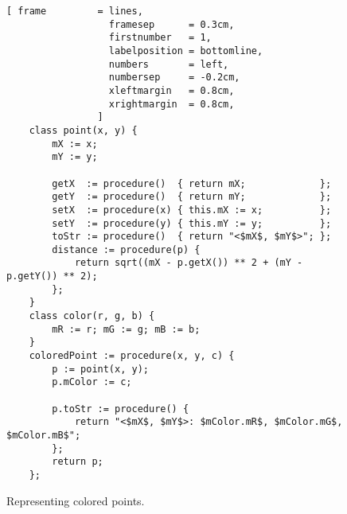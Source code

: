 \begin{figure}[!ht]
\centering
\begin{Verbatim}[ frame         = lines, 
                  framesep      = 0.3cm, 
                  firstnumber   = 1,
                  labelposition = bottomline,
                  numbers       = left,
                  numbersep     = -0.2cm,
                  xleftmargin   = 0.8cm,
                  xrightmargin  = 0.8cm,
                ]
    class point(x, y) {
        mX := x;
        mY := y;
    
        getX  := procedure()  { return mX;             };
        getY  := procedure()  { return mY;             };
        setX  := procedure(x) { this.mX := x;          };
        setY  := procedure(y) { this.mY := y;          };
        toStr := procedure()  { return "<$mX$, $mY$>"; };
        distance := procedure(p) {
            return sqrt((mX - p.getX()) ** 2 + (mY - p.getY()) ** 2);
        };
    }
    class color(r, g, b) {
        mR := r; mG := g; mB := b;
    }    
    coloredPoint := procedure(x, y, c) {
        p := point(x, y);
        p.mColor := c;
        
        p.toStr := procedure() {
            return "<$mX$, $mY$>: $mColor.mR$, $mColor.mG$, $mColor.mB$";
        };
        return p;
    };
\end{Verbatim}
\vspace*{-0.3cm}
\caption{Representing colored points.}
\label{fig:point-colored.stlx}
\end{figure}

